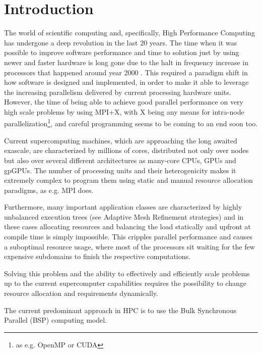 
\section{Introduction}
The world of scientific computing and, specifically, High Performance Computing has undergone a deep revolution in the last 20 years.
The time when it was possible to improve software performance and time to solution just by using newer and faster hardware is long gone due to the halt in frequency increase in processors that happened around year 2000 .
This required a paradigm shift in how software is designed and implemented, in order to make it able to leverage the increasing parallelism delivered by current processing hardware units.
However, the time of being able to achieve good parallel performance on very high scale problems by using MPI+X, with X being any means for intra-node parallelization\footnote{as e.g. OpenMP or CUDA}, and careful programming seems to be coming to an end soon too\cite{heller2017hpx}.

Current supercomputing machines, which are approaching the long awaited exascale, are characterized by millions of cores, distributed not only over nodes but also over several different architectures as many-core CPUs, GPUs and gpGPUs.
The number of processing units and their heterogenicity makes it extremely complex to program them using static and manual resource allocation paradigms, as e.g. MPI does.

Furthermore, many important application classes are characterized by highly unbalanced execution trees (see Adaptive Mesh Refinement strategies) and in these cases allocating resources and balancing the load statically and upfront at compile time is simply impossible.
This cripples parallel performance and causes a suboptimal resource usage, where most of the processors sit waiting for the few expensive subdomains to finish the respective computations.

Solving this problem and the ability to effectively and efficiently scale problems up to the current supercomputer capabilities requires the possibility to change resource allocation and requirements dynamically.

The current predominant approach in HPC is to use the Bulk Synchronous Parallel (BSP) computing model\cite{cheatham1996bulk}.

